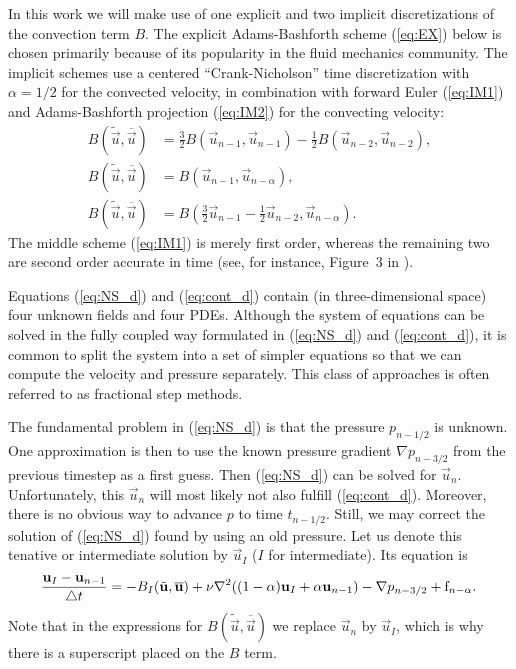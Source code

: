 In this work we will make use of one explicit and two
implicit discretizations of the convection term $B$. 
The explicit  Adams-Bashforth scheme
(\ref{eq:EX}) below is chosen primarily because of its
popularity in the fluid mechanics community. The implicit schemes use
a centered ``Crank-Nicholson'' time discretization with $\alpha=1/2$
for the convected velocity,
in combination with
forward
Euler (\ref{eq:IM1}) and Adams-Bashforth projection (\ref{eq:IM2}) for
the convecting velocity:
\begin{align}
\label{eq:EX} 
B(\tilde{\vec{u}},\overline{\vec{u}}) &=
\frac{3}{2}B(\vec{u}_{n-1},\vec{u}_{n-1})-
\frac{1}{2}B(\vec{u}_{n-2},\vec{u}_{n-2}), \\
\label{eq:IM1} 
B(\tilde{\vec{u}},\overline{\vec{u}}) &=
B(\vec{u}_{n-1},\vec{u}_{n-\alpha}), \\
 \label{eq:IM2} 
B(\tilde{\vec{u}},\overline{\vec{u}}) &=
B(\frac{3}{2}\vec{u}_{n-1}-\frac{1}{2}\vec{u}_{n-2},\vec{u}_{n-\alpha}).
\end{align}
The middle scheme (\ref{eq:IM1}) is merely first order, 
whereas the remaining two are second order accurate in time 
(see, for instance, Figure~3 in \cite{simo94}).

Equations (\ref{eq:NS_d}) and (\ref{eq:cont_d}) contain (in
three-dimensional space) four unknown fields and four PDEs.
Although the system of equations can be solved in the fully coupled
way formulated in  (\ref{eq:NS_d}) and (\ref{eq:cont_d}),
it is common to split the system into a set of simpler equations
so that we can compute the velocity and pressure separately.
This class of approaches is often referred to as fractional step
methods.

The fundamental problem in (\ref{eq:NS_d}) is that the pressure
$p_{n-1/2}$ is unknown. One approximation is then to use the
known pressure gradient $\nabla p_{n-3/2}$ from the previous timestep as a first guess. Then (\ref{eq:NS_d}) can
be solved for $\vec{u}_n$. Unfortunately, this $\vec{u}_n$ will most 
likely not also fulfill
(\ref{eq:cont_d}). Moreover, there is no obvious way to advance $p$
to time $t_{n-1/2}$. Still, we may correct the solution of (\ref{eq:NS_d})
found by using an old pressure. Let us denote this tenative or
intermediate solution
by $\vec{u}_I$ ($I$ for intermediate). Its equation is
\begin{equation} 
\label{eq:NS_FS} 
\frac{{\vec{u}}_{I}-\vec{u}_{n-1}}{\triangle t} = 
- B_I(\tilde{\vec{u}},\overline{\vec{u}}) + 
\nu \nabla^2 ((1-\alpha) {\vec{u}}_{I} + \alpha \vec{u}_{n-1}) 
-\nabla p_{n-3/2} + \text{f}_{n-\alpha} . \thinspace
\end{equation}
Note that in the expressions for $B(\tilde{\vec{u}},\overline{\vec{u}})$
we replace $\vec{u}_n$ by $\vec{u}_I$, which is why there is
a superscript placed on the $B$ term.


